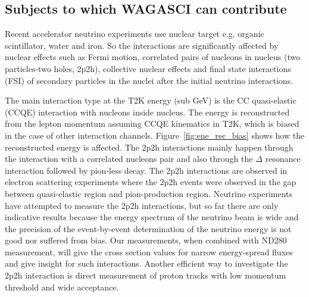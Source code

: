 \subsection{Subjects to which WAGASCI can contribute}
Recent accelerator neutrino experiments use nuclear target e.g. organic scintillator, water and iron.
So the interactions are significantly affected by
nuclear effects such as Fermi motion, correlated pairs of nucleons in nucleus (two particles-two holes, 2p2h), collective nuclear effects 
and final state interactions (FSI) of secondary particles in the nuclei after the initial neutrino interactions.

The main interaction type at the T2K energy (sub GeV) is the CC quasi-elastic (CCQE) interaction with nucleons inside nucleus.
The energy is reconstructed from the lepton momentum assuming CCQE kinematics 
in T2K, which is biased in the case of other interaction channels.
Figure~\ref{fig:ene_rec_bias} shows how the reconstructed energy is affected.
The 2p2h interactions mainly happen through the interaction with a correlated nucleons pair and also through the $\Delta$ resonance interaction
followed by pion-less decay.
The 2p2h interactions are observed in electron scattering experiments \cite{escattering} where the 2p2h events were observed in the gap between quasi-elastic region and pion-production region.%
Neutrino experiments have attempted to measure the 2p2h interactions, but so far there are only indicative results because the energy spectrum of the neutrino beam is wide and the precision of the event-by-event determination of the neutrino energy is not good nor suffered from bias.
Our measurements, when combined with ND280 measurement, will give the cross section values for narrow energy-spread fluxes
and give insight for such interactions. 
Another efficient way to investigate the 2p2h interaction is direct measurement of proton tracks with low momentum threshold and wide acceptance.
